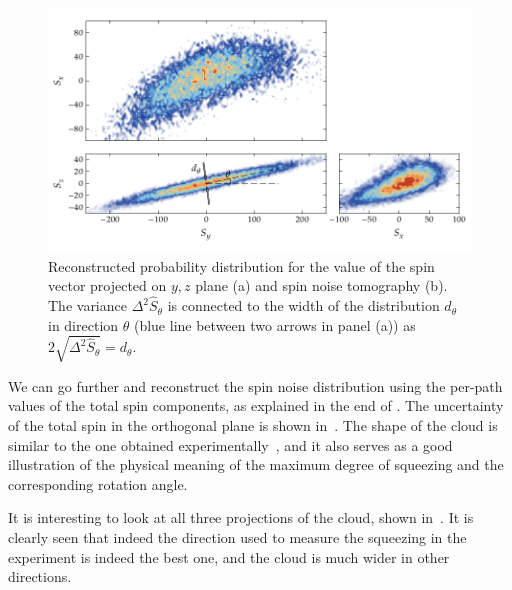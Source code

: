 \begin{figure}
    \centerline{\includegraphics{figures_generated/bec_squeezing/riedel_cloud.pdf}}

    \caption{
    Reconstructed probability distribution for the value of the spin vector projected on $y,z$ plane (a) and spin noise tomography (b).
    The variance $\Delta^2 \hat{S}_\theta$ is connected to the width of the distribution $d_\theta$ in direction $\theta$ (blue line between two arrows in panel (a)) as $2 \sqrt{\Delta^2 \hat{S}_\theta} = d_\theta$.}
    \label{fig:bec-squeezing:separation:cloud-yz}
\end{figure}

We can go further and reconstruct the spin noise distribution using the per-path values of the total spin components, as explained in the end of .
The uncertainty of the total spin in the orthogonal plane is shown in~.
The shape of the cloud is similar to the one obtained experimentally~\cite{Riedel2010}, and it also serves as a good illustration of the physical meaning of the maximum degree of squeezing and the corresponding rotation angle.

It is interesting to look at all three projections of the cloud, shown in~.
It is clearly seen that indeed the direction used to measure the squeezing in the experiment is indeed the best one, and the cloud is much wider in other directions.
